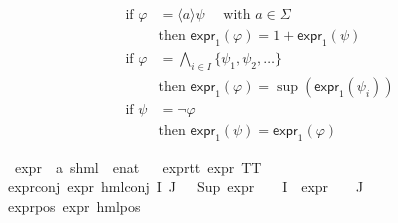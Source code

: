 \begin{isabellebody}
\begin{isamarkuptext}
\begin{align*}
    \text{if } \varphi &= \langle a \rangle \psi \quad \text{ with } a \in \Sigma \\
    &\text{then } \textsf{expr}_1(\varphi) = 1 + \textsf{expr}_1(\psi) \\
    \text{if } \varphi &= \bigwedge_{i \in I} \{ \psi_1, \psi_2, \ldots \} \\
    &\text{then } \textsf{expr}_1(\varphi) = \sup(\textsf{expr}_1(\psi_i)) \\
    \text{if } \psi &= \neg \varphi \\
    &\text{then } \textsf{expr}_1(\psi) = \textsf{expr}_1(\varphi)
\end{align*}%
\end{isamarkuptext}\isamarkuptrue%
\isamarkupfalse%
\ expr{\isacharunderscore}{\kern0pt}{}\ {\isacharcolon}{\kern0pt}{\isacharcolon}{\kern0pt}\ {\isachardoublequoteopen}{\isacharparenleft}{\kern0pt}{\isacharprime}{\kern0pt}a{\isacharcomma}{\kern0pt}\ {\isacharprime}{\kern0pt}s{\isacharparenright}{\kern0pt}hml\ {\isasymRightarrow}\ enat{\isachardoublequoteclose}\isanewline
\ \ \isanewline
expr{\isacharunderscore}{\kern0pt}{}{\isacharunderscore}{\kern0pt}tt{\isacharcolon}{\kern0pt}\ {\isacartoucheopen}expr{\isacharunderscore}{\kern0pt}{}\ TT\ {\isacharequal}{\kern0pt}\ {}{\isacartoucheclose}\ {\isacharbar}{\kern0pt}\isanewline
expr{\isacharunderscore}{\kern0pt}{}{\isacharunderscore}{\kern0pt}conj{\isacharcolon}{\kern0pt}\ {\isacartoucheopen}expr{\isacharunderscore}{\kern0pt}{}\ {\isacharparenleft}{\kern0pt}hml{\isacharunderscore}{\kern0pt}conj\ I\ J\ {\isasymPhi}{\isacharparenright}{\kern0pt}\ {\isacharequal}{\kern0pt}\ Sup\ {\isacharparenleft}{\kern0pt}{\isacharparenleft}{\kern0pt}expr{\isacharunderscore}{\kern0pt}{}\ {\isasymcirc}\ {\isasymPhi}{\isacharparenright}{\kern0pt}\ {\isacharbackquote}{\kern0pt}\ I\ {\isasymunion}\ {\isacharparenleft}{\kern0pt}expr{\isacharunderscore}{\kern0pt}{}\ {\isasymcirc}\ {\isasymPhi}{\isacharparenright}{\kern0pt}\ {\isacharbackquote}{\kern0pt}\ J{\isacharparenright}{\kern0pt}{\isacartoucheclose}\ {\isacharbar}{\kern0pt}\isanewline
expr{\isacharunderscore}{\kern0pt}{}{\isacharunderscore}{\kern0pt}pos{\isacharcolon}{\kern0pt}\ {\isacartoucheopen}expr{\isacharunderscore}{\kern0pt}{}\ {\isacharparenleft}{\kern0pt}hml{\isacharunderscore}{\kern0pt}pos\ {\isasymalpha}\ {\isasymphi}{\isacharparenright}{\kern0pt}\ {\isacharequal}{\kern0pt}\ \isanewline

\end{isabellebody}
